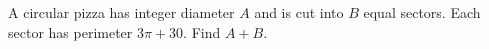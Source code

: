 A circular pizza has integer diameter $A$ and is cut into $B$ equal sectors. Each sector has perimeter $3\pi+30$. Find $A+B$.
